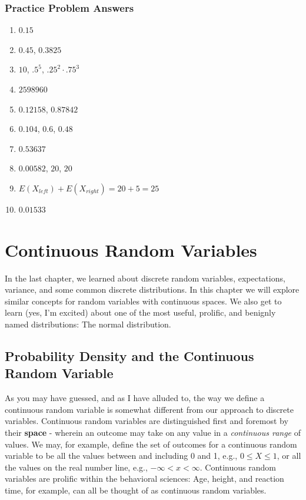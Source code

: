 \documentclass[
]{book}
\theoremstyle{definition}
\theoremstyle{definition}
\theoremstyle{definition}
\theoremstyle{definition}
\theoremstyle{remark}
\begin{document}
\subsection{Practice Problem Answers}\label{practice-problem-answers}

\begin{enumerate}
\def\labelenumi{\arabic{enumi}.}
\item
  \(0.15\)
\item
  \(0.45\), \(0.3825\)
\item
  \(10\), \(.5^5\), \(.25^2\cdot.75^3\)
\item
  \(2598960\)
\item
  \(0.12158\), \(0.87842\)
\item
  \(0.104\), \(0.6\), \(0.48\)
\item
  \(0.53637\)
\item
  \(0.00582\), \(20\), \(20\)
\item
  \(E(X_{left}) + E(X_{right}) = 20 + 5 = 25\)
\item
  \(0.01533\)
\end{enumerate}

\chapter{Continuous Random Variables}\label{continuous-random-variables}

In the last chapter, we learned about discrete random variables, expectations, variance, and some common discrete distributions. In this chapter we will explore similar concepts for random variables with continuous spaces. We also get to learn (yes, I'm excited) about one of the most useful, prolific, and benignly named distributions: The normal distribution.

\section{Probability Density and the Continuous Random Variable}\label{probability-density-and-the-continuous-random-variable}

As you may have guessed, and as I have alluded to, the way we define a continuous random variable is somewhat different from our approach to discrete variables. Continuous random variables are distinguished first and foremost by their \textbf{space} - wherein an outcome may take on any value in a \emph{continuous range} of values. We may, for example, define the set of outcomes for a continuous random variable to be all the values between and including 0 and 1, e.g., \(0 \leq X \leq 1\), or all the values on the real number line, e.g., \(-\infty < x < \infty\). Continuous random variables are prolific within the behavioral sciences: Age, height, and reaction time, for example, can all be thought of as continuous random variables.
\end{document}
